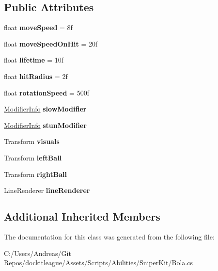 \subsection*{Public Attributes}
\begin{DoxyCompactItemize}
\item 
\hypertarget{class_bola_aa704e2662ed70e27bfdbeb3f9c5fb495}{}\label{class_bola_aa704e2662ed70e27bfdbeb3f9c5fb495} 
float {\bfseries move\+Speed} = 8f
\item 
\hypertarget{class_bola_a88dceeea33e0e43d4178342f45572831}{}\label{class_bola_a88dceeea33e0e43d4178342f45572831} 
float {\bfseries move\+Speed\+On\+Hit} = 20f
\item 
\hypertarget{class_bola_a79d7871e69b430ae7e68a9402d319522}{}\label{class_bola_a79d7871e69b430ae7e68a9402d319522} 
float {\bfseries lifetime} = 10f
\item 
\hypertarget{class_bola_a8a98b5a9b55c19f9f9305400176d545d}{}\label{class_bola_a8a98b5a9b55c19f9f9305400176d545d} 
float {\bfseries hit\+Radius} = 2f
\item 
\hypertarget{class_bola_a077df3eea94cc3d19b60a4c31e5babad}{}\label{class_bola_a077df3eea94cc3d19b60a4c31e5babad} 
float {\bfseries rotation\+Speed} = 500f
\item 
\hypertarget{class_bola_a1aecea185e3a1ad6908ca7b485cb41e5}{}\label{class_bola_a1aecea185e3a1ad6908ca7b485cb41e5} 
\hyperlink{struct_modifier_info}{Modifier\+Info} {\bfseries slow\+Modifier}
\item 
\hypertarget{class_bola_a5fc6fa21d669b4a2d13a33ae23884040}{}\label{class_bola_a5fc6fa21d669b4a2d13a33ae23884040} 
\hyperlink{struct_modifier_info}{Modifier\+Info} {\bfseries stun\+Modifier}
\item 
\hypertarget{class_bola_a29d503e8c88ec2a4daa0e506a0792cff}{}\label{class_bola_a29d503e8c88ec2a4daa0e506a0792cff} 
Transform {\bfseries visuals}
\item 
\hypertarget{class_bola_ae0b4cffd86ae9c7518c1184f16310d9d}{}\label{class_bola_ae0b4cffd86ae9c7518c1184f16310d9d} 
Transform {\bfseries left\+Ball}
\item 
\hypertarget{class_bola_ae87d742c7ac386313df211696649463b}{}\label{class_bola_ae87d742c7ac386313df211696649463b} 
Transform {\bfseries right\+Ball}
\item 
\hypertarget{class_bola_ab3e1a63aef86c32b6457a9aca4e2a563}{}\label{class_bola_ab3e1a63aef86c32b6457a9aca4e2a563} 
Line\+Renderer {\bfseries line\+Renderer}
\end{DoxyCompactItemize}
\subsection*{Additional Inherited Members}


The documentation for this class was generated from the following file\+:\begin{DoxyCompactItemize}
\item 
C\+:/\+Users/\+Andreas/\+Git Repos/dockitleague/\+Assets/\+Scripts/\+Abilities/\+Sniper\+Kit/Bola.\+cs\end{DoxyCompactItemize}
